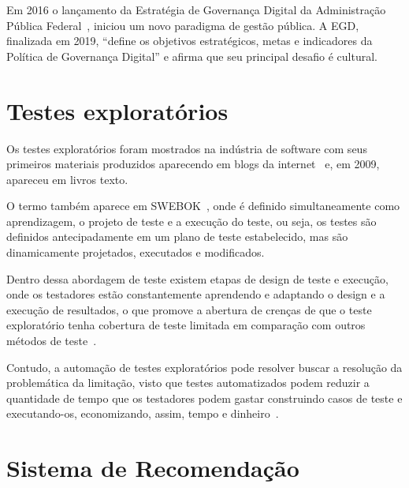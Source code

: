 Em 2016 o lançamento da Estratégia de Governança Digital da Administração Pública Federal~\cite{BRASIL}, iniciou um novo paradigma de gestão pública. A EGD, finalizada em 2019,
“define os objetivos estratégicos, metas e indicadores da Política de Governança Digital” e afirma que seu principal desafio é cultural.


\section{Testes exploratórios}

Os testes exploratórios foram mostrados na indústria de software com seus primeiros materiais produzidos 
aparecendo em blogs da internet~\cite{kaner2000testing} e, em 2009, apareceu em livros texto. 

O termo também aparece em SWEBOK~\cite{bourque2014guide}, onde é definido simultaneamente como aprendizagem, o projeto de teste 
e a execução do teste, ou seja, os testes são definidos antecipadamente em um plano de teste estabelecido, mas 
são dinamicamente projetados, executados e modificados.

Dentro dessa abordagem de teste existem etapas de design de teste e execução, onde os testadores estão constantemente aprendendo e 
adaptando o design e a execução de resultados, o que promove a abertura de crenças de que o teste exploratório tenha cobertura de 
teste limitada em comparação com outros métodos de teste~\cite{schaefer2014model}.

Contudo, a automação de testes exploratórios pode resolver buscar a resolução da problemática da limitação, visto que testes 
automatizados podem reduzir a quantidade de tempo que os testadores podem gastar construindo casos de teste e executando-os, 
economizando, assim, tempo e dinheiro~\cite{dustin2009implementing}. 


\section{Sistema de Recomendação}
